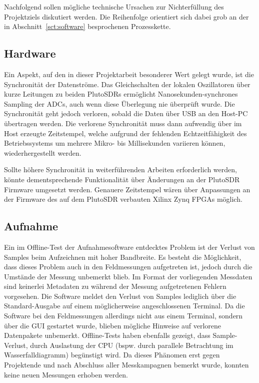 Nachfolgend sollen mögliche technische Ursachen zur Nichterfüllung des Projektziels diskutiert werden. Die Reihenfolge orientiert sich dabei grob an der in Abschnitt~\ref{sct:software} besprochenen Prozesskette.

\subsection{Hardware}

Ein Aspekt, auf den in dieser Projektarbeit besonderer Wert gelegt wurde, ist die Synchronität der Datenströme. Das Gleichschalten der lokalen Oszillatoren über kurze Leitungen zu beiden PlutoSDRs ermöglicht Nanosekunden-synchrones Sampling der ADCs, auch wenn diese Überlegung nie überprüft wurde. Die Synchronität geht jedoch verloren, sobald die Daten über USB an den Host-PC übertragen werden. Die verlorene Synchronität muss dann aufwendig über im Host erzeugte Zeitstempel, welche aufgrund der fehlenden Echtzeitfähigkeit des Betriebssystems um mehrere Mikro- bis Millisekunden variieren können, wiederhergestellt werden.

Sollte höhere Synchronität in weiterführenden Arbeiten erforderlich werden, könnte dementsprechende Funktionalität über Änderungen an der PlutoSDR Firmware umgesetzt werden. Genauere Zeitstempel wären über Anpassungen an der Firmware des auf dem PlutoSDR verbauten Xilinx Zynq FPGAs möglich.

\subsection{Aufnahme}

Ein im Offline-Test der Aufnahmesoftware entdecktes Problem ist der Verlust von Samples beim Aufzeichnen mit hoher Bandbreite. Es besteht die Möglichkeit, dass dieses Problem auch in den Feldmessungen aufgetreten ist, jedoch durch die Umstände der Messung unbemerkt blieb. Im Format der vorliegenden Messdaten sind keinerlei Metadaten zu während der Messung aufgetretenen Fehlern vorgesehen. Die Software meldet den Verlust von Samples lediglich über die Standard-Ausgabe auf einem möglicherweise angeschlossenen Terminal. Da die Software bei den Feldmessungen allerdings nicht aus einem Terminal, sondern über die GUI gestartet wurde, blieben mögliche Hinweise auf verlorene Datenpakete unbemerkt. Offline-Tests haben ebenfalls gezeigt, dass Sample-Verlust, durch Auslastung der CPU (bspw\@. durch parallele Betrachtung im Wasserfalldiagramm) begünstigt wird. Da dieses Phänomen erst gegen Projektende und nach Abschluss aller Messkampagnen bemerkt wurde, konnten keine neuen Messungen erhoben werden.

